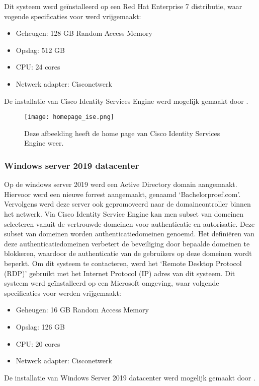 Dit systeem werd geïnstalleerd op een Red Hat Enterprise 7 distributie, waar vogende specificaties voor werd vrijgemaakt: 

\begin{itemize}
	\item Geheugen: 128 GB Random Access Memory
	\item Opslag: 512 GB
	\item CPU: 24 cores
	\item Netwerk adapter: Cisco\textunderscore netwerk
\end{itemize}

De installatie van Cisco Identity Services Engine werd mogelijk gemaakt door \cite{CiscoISE_InstallationGuide}.

\begin{figure}[H]
	\centering
	\texttt{[image: homepage\_ise.png]}
	\caption{Deze afbeelding heeft de home page van Cisco Identity Services Engine weer.}
\end{figure}

\subsubsection{Windows server 2019 datacenter}
Op de windows server 2019 werd een Active Directory domain aangemaakt. Hiervoor werd een nieuwe forrest aangemaakt, genaamd ‘Bachelorproef.com’. Vervolgens werd deze server ook gepromoveerd naar de domaincontroller binnen het netwerk.
\newline
\newline
Via Cisco Identity Service Engine kan men subset van domeinen selecteren vanuit de vertrouwde domeinen voor authenticatie en autorisatie. Deze subset van domeinen worden authenticatiedomeinen genoemd. Het definiëren van deze authenticatiedomeinen verbetert de beveiliging door bepaalde domeinen te blokkeren, waardoor de authenticatie van de gebruikers op deze domeinen wordt beperkt.
\newline
\newline
Om dit systeem te contacteren, werd het ‘Remote Desktop Protocol (RDP)’ gebruikt met het Internet Protocol (IP) adres van dit systeem.
\newline
\newline
Dit systeem werd geïnstalleerd op een Microsoft omgeving, waar volgende specificaties voor werden vrijgemaakt:

\begin{itemize}
	\item Geheugen: 16 GB Random Access Memory
	\item Opslag: 126 GB
	\item CPU: 20 cores
	\item Netwerk adapter: Cisco\textunderscore netwerk
\end{itemize}
De installatie van Windows Server 2019 datacenter werd mogelijk gemaakt door \cite{Win19_InstallationGuide}. 

